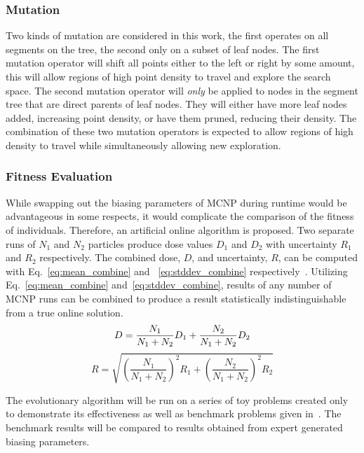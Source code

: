 \documentclass{article}
\begin{document}
\subsubsection{Mutation}
Two kinds of mutation are considered in this work, the first operates on all segments on the tree, the second only on a subset of leaf nodes. The first mutation operator will shift all points either to the left or right by some amount, this will allow regions of high point density to travel and explore the search space. The second mutation operator will \textit{only} be applied to nodes in the segment tree that are direct parents of leaf nodes. They will either have more leaf nodes added, increasing point density, or have them pruned, reducing their density. The combination of these two mutation operators is expected to allow regions of high density to travel while simultaneously allowing new exploration.

\subsubsection{Fitness Evaluation}
While swapping out the biasing parameters of MCNP during runtime would be advantageous in some respects, it would complicate the comparison of the fitness of individuals. Therefore, an artificial online algorithm is proposed. Two separate runs of $N_1$ and $N_2$ particles produce dose values $D_1$ and $D_2$ with uncertainty $R_1$ and $R_2$ respectively. The combined dose, $D$, and uncertainty, $R$, can be computed with Eq.~\ref{eq:mean_combine} and ~\ref{eq:stddev_combine} respectively~\cite{ref:knoll2000}. Utilizing Eq.~\ref{eq:mean_combine} and~\ref{eq:stddev_combine}, results of any number of MCNP runs can be combined to produce a result statistically indistinguishable from a true online solution.
\begin{equation}\label{eq:mean_combine}
D = \frac{N_1}{N_1 + N_2} D_1 + \frac{N_2}{N_1 + N_2} D_2 \\
\end{equation}
\begin{equation}\label{eq:stddev_combine}
R = \sqrt{\left( \frac{N_1}{N_1 + N_2}\right)^2 R_1 + \left( \frac{N_2}{N_1 + N_2}\right)^2 R_2}
\end{equation}

The evolutionary algorithm will be run on a series of toy problems created only to demonstrate its effectiveness as well as benchmark problems given in~\cite{ref:Mosher2015}. The benchmark results will be compared to results obtained from expert generated biasing parameters.
\end{document}
